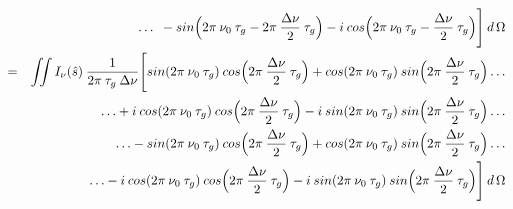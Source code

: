 \documentclass[11pt, a4paper]{article}
\newcommand{\msp}{\mkern \medmuskip}
\begin{document}
\begin{eqnarray}
&& \dotso \enspace - sin\Big (2\pi \msp \nu_ 0 \msp \tau _g - 2\pi \msp \frac{\Delta \nu }{2} \msp \tau _g\Big ) - i \msp cos\Big (2\pi \msp \nu_ 0 \msp \tau _g - \frac{\Delta \nu }{2} \msp \tau _g\Big )\Bigg ] \msp d\,\Omega \nonumber \\
&=& \iint I_\nu (\hat{s}) \msp \frac{1}{2\pi \msp \tau _g \msp \Delta \nu} \Bigg [sin (2\pi \msp \nu_ 0 \msp \tau _g) \msp cos\Big (2\pi \msp \frac{\Delta \nu }{2} \msp \tau _g\Big ) + cos(2\pi \msp \nu_ 0 \msp \tau _g) \msp sin\Big (2\pi \msp \frac{\Delta \nu }{2} \msp \tau _g\Big ) \dotso \nonumber \\
&& \dotso + i \msp cos (2\pi \msp \nu_ 0 \msp \tau _g) \msp cos\Big (2\pi \msp \frac{\Delta \nu }{2} \msp \tau _g\Big ) - i \msp sin(2\pi \msp \nu_ 0 \msp \tau _g) \msp sin\Big (2\pi \msp \frac{\Delta \nu }{2} \msp \tau _g\Big ) \dotso \nonumber \\
&& \dotso - sin (2\pi \msp \nu_ 0 \msp \tau _g) \msp cos\Big (2\pi \msp \frac{\Delta \nu }{2} \msp \tau _g\Big ) + cos(2\pi \msp \nu_ 0 \msp \tau _g) \msp sin\Big (2\pi \msp \frac{\Delta \nu }{2} \msp \tau _g\Big ) \dotso \nonumber \\
&& \dotso - i \msp cos (2\pi \msp \nu_ 0 \msp \tau _g) \msp cos\Big (2\pi \msp \frac{\Delta \nu }{2} \msp \tau _g\Big ) - i \msp sin(2\pi \msp \nu_ 0 \msp \tau _g) \msp sin\Big (2\pi \msp \frac{\Delta \nu }{2} \msp \tau _g\Big )\Bigg ] \msp d\,\Omega \nonumber
\end{eqnarray}
\end{document}
